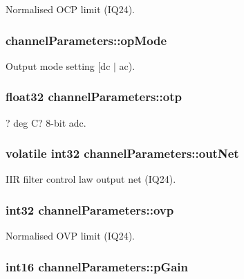 Normalised O\-C\-P limit (I\-Q24). \hypertarget{structchannel_parameters_a25d490fa4d7487c8e2e21c1400a6b99b}{
\subsubsection[{op\-Mode}]{ channel\-Parameters\-::op\-Mode}}\label{structchannel_parameters_a25d490fa4d7487c8e2e21c1400a6b99b}
Output mode setting \mbox{[}dc $|$ ac). \hypertarget{structchannel_parameters_a458c22593d95ea92268aeabe975f6f66}{
\subsubsection[{otp}]{\setlength{\rightskip}{0pt plus 5cm}float32 channel\-Parameters\-::otp}}\label{structchannel_parameters_a458c22593d95ea92268aeabe975f6f66}
? deg C? 8-\/bit adc. \hypertarget{structchannel_parameters_ae9a6e93b8f7d8554dd06269339167215}{
\subsubsection[{out\-Net}]{\setlength{\rightskip}{0pt plus 5cm}volatile int32 channel\-Parameters\-::out\-Net}}\label{structchannel_parameters_ae9a6e93b8f7d8554dd06269339167215}
I\-I\-R filter control law output net (I\-Q24). \hypertarget{structchannel_parameters_aefb9a7e765e361d08e0ae0bbc352e244}{
\subsubsection[{ovp}]{\setlength{\rightskip}{0pt plus 5cm}int32 channel\-Parameters\-::ovp}}\label{structchannel_parameters_aefb9a7e765e361d08e0ae0bbc352e244}
Normalised O\-V\-P limit (I\-Q24). \hypertarget{structchannel_parameters_a2d6c1295ab4c4182bf3f713c283aa37e}{
\subsubsection[{p\-Gain}]{\setlength{\rightskip}{0pt plus 5cm}int16 channel\-Parameters\-::p\-Gain}}\label{structchannel_parameters_a2d6c1295ab4c4182bf3f713c283aa37e}
